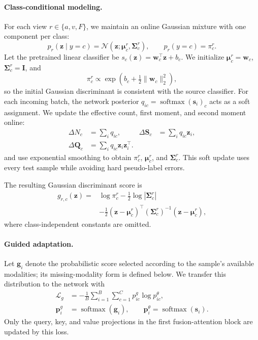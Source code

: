 \paragraph{Class-conditional modeling.}
For each view $r\in\{a,v,F\}$, we maintain an online Gaussian mixture with one
component per class:
\begin{equation}
  p_r(\bm z\mid y=c)=
  \mathcal{N}(\bm z;\bm\mu_c^r,\bm\Sigma_c^r),
  \qquad p_r(y=c)=\pi_c^r .
  \label{eq:gmm}
\end{equation}
Let the pretrained linear classifier be
$s_c(\bm z)=\bm w_c^{\top}\bm z+b_c$.  We initialize
$\bm\mu_c^r=\bm w_c$, $\bm\Sigma_c^r=\bm I$, and
\begin{equation}
  \pi_c^r\propto
  \exp\!\left(b_c+\tfrac{1}{2}\lVert\bm w_c\rVert_2^2\right),
  \label{eq:init}
\end{equation}
so the initial Gaussian discriminant is consistent with the source
classifier.  For each incoming batch, the network posterior
$q_{ic}=\operatorname{softmax}(\bm s_i)_c$ acts as a soft assignment.  We
update the effective count, first moment, and second moment online:
\begin{equation}
  \begin{aligned}
    \Delta N_c&=\sum_i q_{ic}, &
    \Delta\bm S_c&=\sum_i q_{ic}\bm z_i,\\
    \Delta\bm Q_c&=\sum_i q_{ic}\bm z_i\bm z_i^{\top}.
  \end{aligned}
  \label{eq:stats}
\end{equation}
and use exponential smoothing to obtain $\pi_c^r$, $\bm\mu_c^r$, and
$\bm\Sigma_c^r$.  This soft update uses every test sample while avoiding
hard pseudo-label errors.

The resulting Gaussian discriminant score is
\begin{equation}
  \begin{aligned}
  g_{r,c}(\bm z)={}&\log\pi_c^r-
  \tfrac{1}{2}\log|\bm\Sigma_c^r|\\
  &-\tfrac{1}{2}(\bm z-\bm\mu_c^r)^{\top}
  (\bm\Sigma_c^r)^{-1}(\bm z-\bm\mu_c^r),
  \end{aligned}
  \label{eq:gda}
\end{equation}
where class-independent constants are omitted.

\paragraph{Guided adaptation.}
Let $\bm g_i$ denote the probabilistic score selected according to the
sample's available modalities; its missing-modality form is defined below.
We transfer this distribution to the network with
\begin{equation}
  \begin{aligned}
  \mathcal{L}_{g}&=-\frac{1}{B}\sum_{i=1}^{B}
  \sum_{c=1}^{C}p^g_{ic}\log p^{\theta}_{ic},\\
  \bm p_i^g&=\operatorname{softmax}(\bm g_i),\qquad
  \bm p_i^{\theta}=\operatorname{softmax}(\bm s_i).
  \end{aligned}
  \label{eq:guidance}
\end{equation}
Only the query, key, and value projections in the first fusion-attention
block are updated by this loss.

